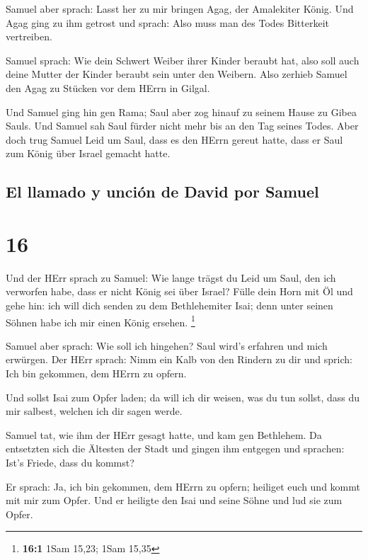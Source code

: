  Samuel aber sprach: Lasst her zu mir bringen Agag, der
Amalekiter König. Und Agag ging zu ihm getrost und sprach: Also muss man
des Todes Bitterkeit vertreiben.

 Samuel sprach: Wie dein Schwert Weiber ihrer Kinder
beraubt hat, also soll auch deine Mutter der Kinder beraubt sein unter
den Weibern. Also zerhieb Samuel den Agag zu Stücken vor dem HErrn in
Gilgal.

 Und Samuel ging hin gen Rama; Saul aber zog hinauf zu
seinem Hause zu Gibea Sauls.  Und Samuel sah Saul fürder
nicht mehr bis an den Tag seines Todes. Aber doch trug Samuel Leid um
Saul, dass es den HErrn gereut hatte, dass er Saul zum König über Israel
gemacht hatte.

\hypertarget{el-llamado-y-unciuxf3n-de-david-por-samuel}{%
\subsection{El llamado y unción de David por
Samuel}\label{el-llamado-y-unciuxf3n-de-david-por-samuel}}

\hypertarget{section-15}{%
\section{16}\label{section-15}}

 Und der HErr sprach zu Samuel: Wie lange trägst du Leid
um Saul, den ich verworfen habe, dass er nicht König sei über Israel?
Fülle dein Horn mit Öl und gehe hin: ich will dich senden zu dem
Bethlehemiter Isai; denn unter seinen Söhnen habe ich mir einen König
ersehen. \footnote{\textbf{16:1} 1Sam 15,23; 1Sam 15,35}

 Samuel aber sprach: Wie soll ich hingehen? Saul wird's
erfahren und mich erwürgen. Der HErr sprach: Nimm ein Kalb von den
Rindern zu dir und sprich: Ich bin gekommen, dem HErrn zu opfern.

 Und sollst Isai zum Opfer laden; da will ich dir weisen,
was du tun sollst, dass du mir salbest, welchen ich dir sagen werde.

 Samuel tat, wie ihm der HErr gesagt hatte, und kam gen
Bethlehem. Da entsetzten sich die Ältesten der Stadt und gingen ihm
entgegen und sprachen: Ist's Friede, dass du kommst?

 Er sprach: Ja, ich bin gekommen, dem HErrn zu opfern;
heiliget euch und kommt mit mir zum Opfer. Und er heiligte den Isai und
seine Söhne und lud sie zum Opfer.

